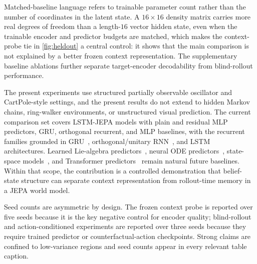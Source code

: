 Matched-baseline language refers to trainable parameter count rather
than the number of coordinates in the latent state. A $16\times16$
density matrix carries more real degrees of freedom than a length-$16$
vector hidden state, even when the trainable encoder and predictor
budgets are matched, which makes the context-probe tie in
\cref{fig:heldout} a central control: it shows that the main
comparison is not explained by a better frozen context representation.
The supplementary baseline ablations further separate target-encoder
decodability from blind-rollout performance.

The present experiments use structured partially observable oscillator
and CartPole-style settings, and the present results do not extend to
hidden Markov chains, ring-walker environments, or unstructured visual
prediction. The current comparison set covers LSTM-JEPA models with
plain and residual MLP predictors, GRU, orthogonal recurrent, and MLP
baselines, with the recurrent families grounded in
GRU~\cite{cho2014learning}, orthogonal/unitary
RNN~\cite{arjovsky2016unitary,wisdom2016full}, and
LSTM~\cite{hochreiter1997long} architectures. Learned Lie-algebra
predictors~\cite{greydanus2019hamiltonian}, neural ODE
predictors~\cite{chen2018neural}, state-space
models~\cite{gu2022efficiently,gu2023mamba}, and Transformer
predictors~\cite{vaswani2017attention} remain natural future
baselines. Within that scope, the contribution is a controlled
demonstration that belief-state structure can separate context
representation from rollout-time memory in a JEPA world model.

Seed counts are asymmetric by design. The frozen context probe is
reported over five seeds because it is the key negative control for
encoder quality; blind-rollout and action-conditioned experiments are
reported over three seeds because they require trained predictor or
counterfactual-action checkpoints. Strong claims are confined to
low-variance regions and seed counts appear in every relevant table
caption.
